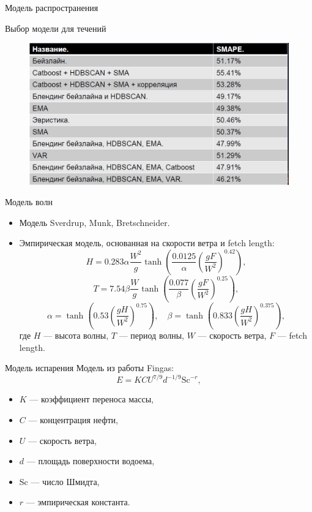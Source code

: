 \documentclass{beamer}
\begin{document}
\begin{section}{Модель распространения}
\begin{frame}{Выбор модели для течений}
\begin{figure}[H]
	\centering
	\includegraphics[scale=0.55]{currents_choice_of_model.png}
\end{figure}

\end{frame}

\begin{frame}{Модель волн}
\begin{itemize}
	\item Модель Sverdrup, Munk, Bretschneider.
	\item Эмпирическая модель, основанная на скорости ветра и fetch length:
	$$H = 0.283\alpha \frac{W^2}{g}\tanh\left(\frac{0.0125}{\alpha}\left(\frac{gF}{W^2}\right)^{0.42}\right),$$
	$$T = 7.54\beta\frac{W}{g}\tanh\left(\frac{0.077}{\beta}\left(\frac{gF}{W^2}\right)^{0.25}\right),$$
	$$\alpha = \tanh\left(0.53 \left(\frac{gH}{W^2}\right)^{0.75}\right),\quad \beta = \tanh\left(0.833\left(\frac{gH}{W^2}\right)^{0.375}\right),$$
	где $H$ --- высота волны, $T$ --- период волны, $W$ --- скорость ветра, $F$ --- fetch length.
\end{itemize}
\end{frame}

\begin{frame}{Модель испарения}
Модель из работы Fingas:
$$E = KCU^{7/9}d^{-1/9}\textrm{Sc}^{-r},$$
\begin{itemize}
	\item $K$ --- коэффициент переноса массы,
	\item $C$ --- концентрация нефти,
	\item $U$ --- скорость ветра,
	\item $d$ --- площадь поверхности водоема,
	\item Sc --- число Шмидта,
	\item $r$ --- эмпирическая константа. 
\end{itemize}
\end{frame}


\end{section}
\end{document}
